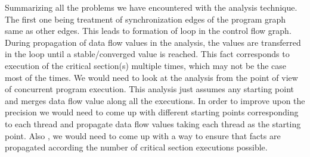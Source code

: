 Summarizing all the problems we have encountered with the analysis technique. The first one being treatment of synchronization edges of the program graph same as other edges. This leads to formation of loop in the control flow graph. During propagation of data flow values in the analysis, the values are transferred in the loop until a stable/converged value is reached. This fact corresponds to execution of the critical section(s) multiple times, which may not be the case most of the times. We would need to look at the analysis from the point of view of concurrent program execution. This analysis just assumes any starting point and merges data flow value along all the executions. In order to improve upon the precision we would need to come up with different starting points corresponding to each thread and propagate data flow values taking each thread as the starting point. Also , we would need to come up with a way to ensure that facts are propagated according the number of critical section executions possible.           